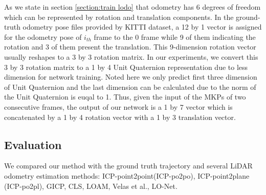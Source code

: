 \documentclass[sigconf]{acmart}
\begin{document}
As we state in section \ref{section:train lodo} that odometry has 6 degrees of freedom which can be represented by rotation and translation components. In the ground-truth odometry pose files provided by KITTI dataset, a 12 by 1 vector is assigned for the odometry pose of $i_{th}$ frame to the 0 frame while 9 of them indicating the rotation and 3 of them present the translation. This 9-dimension rotation vector usually reshapes to a 3 by 3 rotation matrix. In our experiments, we convert this 3 by 3 rotation matrix to a 1 by 4 Unit Quaternion representation due to less dimension for network training. Noted here we only predict first three dimension of Unit Quaternion and the last dimension can be calculated due to the norm of the Unit Quaternion is euqal to 1. Thus, given the input of the MKPs of two consecutive frames, the output of our network is a 1 by 7 vector which is concatenated by a 1 by 4 rotation vector with a 1 by 3 translation vector.

\subsection{Evaluation}
We compared our method with the ground truth trajectory and several LiDAR odometry estimation methods: ICP-point2point(ICP-po2po), ICP-point2plane (ICP-po2pl), GICP\cite{GICP}, CLS\cite{CLS}, LOAM\cite{LOAM}, Velas et al.\cite{Velas}, LO-Net\cite{LO-Net}.
\end{document}
